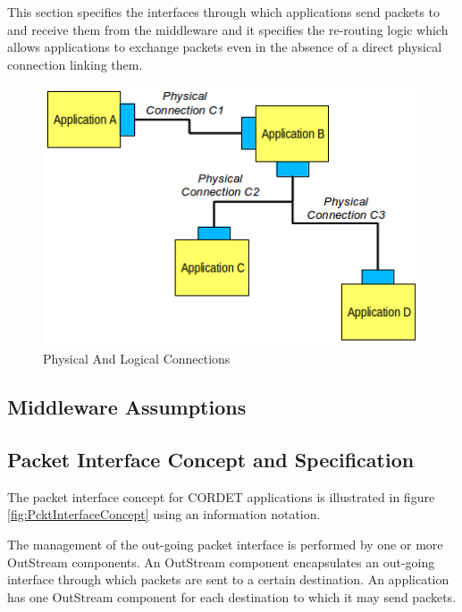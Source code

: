 \documentclass[a4paper,10pt]{article}
\begin{document}
This section specifies the interfaces through which applications send packets to and receive them from the middleware and it specifies the re-routing logic which allows applications to exchange packets even in the absence of a direct physical connection linking them. 

\begin{figure}[ht]
 \centering
 \includegraphics[scale=0.45,keepaspectratio=true]{PhysicalAndLogicalConnections.png}
 \caption{Physical And Logical Connections}
 \label{fig:PhysicalAndLogicalConnections}
\end{figure} 

\subsection{Middleware Assumptions}\label{sec:MwAssumptions}
 

\subsection{Packet Interface Concept and Specification}\label{sec:PcktInterfaceConcept}

The packet interface concept for CORDET applications is illustrated in figure \ref{fig:PcktInterfaceConcept} using an information notation.

The management of the out-going packet interface is performed by one or more OutStream components. An OutStream component encapsulates an out-going interface through which packets are sent to a certain destination. An application has one OutStream component for each destination to which it may send packets.
\end{document}
